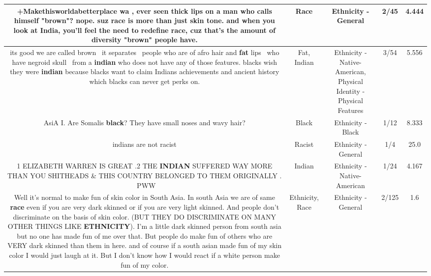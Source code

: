 \documentclass[11pt]{article}
\newlength\mylength
\begin{document}
\begin{center}
\begin{longtable}{|C{.65\mylength}|C{.30\mylength}|C{.12\mylength}|C{.12\mylength}|C{.12\mylength}|}
  \small +Makethisworldabetterplace wa , ever seen thick lips on a man who calls himself "brown"? nope. suz \textbf{race} is more than just skin tone. and when you look at India, you'll feel the need to redefine \textbf{race}, cuz that's the amount of diversity "brown" people have.\normalsize   & Race & Ethnicity - General & 2/45 & 4.444 \\  \hline
  \small its good we are called brown  it separates  people who are of afro hair and \textbf{fat} lips  who have negroid skull  from a \textbf{indian} who does not have any of those features. blacks wish they were \textbf{indian} because blacks want to claim Indians achievements and ancient history which blacks can never get perks on.\normalsize   & Fat, Indian & Ethnicity - Native-American, Physical Identity - Physical Features & 3/54 & 5.556 \\  \hline
  \small AsiA I. Are Somalis \textbf{black}? They have small noses and wavy hair?\normalsize   & Black & Ethnicity - Black & 1/12 & 8.333 \\  \hline
  \small indians are not racist\normalsize   & Racist & Ethnicity - General & 1/4 & 25.0 \\  \hline
  \small 1 ELIZABETH WARREN IS GREAT .2 THE \textbf{INDIAN} SUFFERED WAY MORE THAN YOU SHITHEADS \& THIS COUNTRY BELONGED TO THEM ORIGINALLY .  PWW\normalsize   & Indian & Ethnicity - Native-American & 1/24 & 4.167 \\  \hline
  \small Well it's normal to make fun of skin color in South Asia. In south Asia we are of same \textbf{race} even if you are very dark skinned or if you are very light skinned. And people don't discriminate on the basis of skin color. (BUT THEY DO DISCRIMINATE ON MANY OTHER THINGS LIKE \textbf{ETHNICITY}). I'm a little dark skinned person from south asia but no one has made fun of me over that. But people do make fun of others who are VERY dark skinned than them in here. and of course if a south asian made fun of my skin color I would just laugh at it. But I don't know how I would react if a white person make fun of my color.\normalsize   & Ethnicity, Race & Ethnicity - General & 2/125 & 1.6 \\  \hline

\end{longtable}
\end{center}
\end{document}
